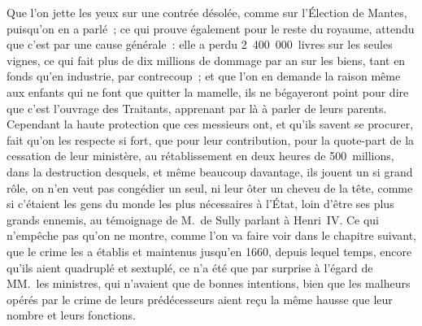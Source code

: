 \documentclass[french,twoside]{book} %
\begin{document}
Que l’on jette les yeux sur une contrée désolée, comme sur l’Élection de Mantes, puisqu’on en a parlé ; ce qui prouve également pour le reste du royaume, attendu que c’est par une cause générale : elle a perdu 2 400 000 livres sur les seules vignes, ce qui fait plus de dix millions de dommage par an sur les biens, tant en fonds qu’en industrie, par contrecoup ; et que l’on en demande la raison même aux enfants qui ne font que quitter la mamelle, ils ne bégayeront point pour dire que c’est l’ouvrage des Traitants, apprenant par là à parler de leurs parents. Cependant la haute protection que ces messieurs ont, et qu’ils savent se procurer, fait qu’on les respecte si fort, que pour leur contribution, pour la quote-part de la cessation de leur ministère, au rétablissement en deux heures de 500 millions, dans la destruction desquels, et même beaucoup davantage, ils jouent un si grand rôle, on n’en veut pas congédier un seul, ni leur ôter un cheveu de la tête, comme si c’étaient les gens du monde les plus nécessaires à l’État, loin d’être ses plus grands ennemis, au témoignage de M. de Sully parlant à Henri IV. Ce qui n’empêche pas qu’on ne montre, comme l’on va faire voir dans le chapitre suivant, que le crime les a établis et maintenus jusqu’en 1660, depuis lequel temps, encore qu’ils aient quadruplé et sextuplé, ce n’a été que par surprise à l’égard de MM. les ministres, qui n’avaient que de bonnes intentions, bien que les malheurs opérés par le crime de leurs prédécesseurs aient reçu la même hausse que leur nombre et leurs fonctions.
\end{document}
